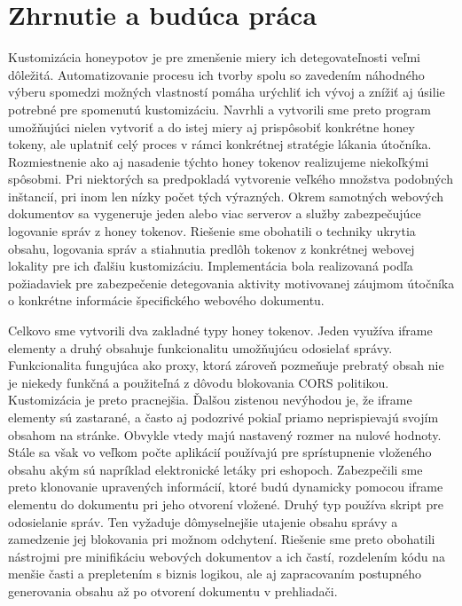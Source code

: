 \documentclass[conference, 11pt,slovak,a4paper,twoside]{IEEEtran}
\begin{document}
\section{Zhrnutie a budúca práca} \label{conclusions}

Kustomizácia honeypotov je pre zmenšenie miery ich detegovateľnosti veľmi dôležitá. Automatizovanie procesu ich tvorby spolu so zavedením náhodného výberu spomedzi možných vlastností pomáha urýchliť ich vývoj a znížiť aj úsilie potrebné pre spomenutú kustomizáciu. Navrhli a vytvorili sme preto program umožňujúci nielen vytvoriť a do istej miery aj prispôsobiť konkrétne honey tokeny, ale uplatniť celý proces v rámci konkrétnej stratégie lákania útočníka. Rozmiestnenie ako aj nasadenie týchto honey tokenov realizujeme niekoľkými spôsobmi. Pri niektorých sa predpokladá vytvorenie veľkého množstva podobných inštancií, pri inom len nízky počet tých výrazných. Okrem samotných webových dokumentov sa vygeneruje jeden alebo viac serverov a služby zabezpečujúce logovanie správ z honey tokenov. Riešenie sme obohatili o techniky ukrytia obsahu, logovania správ a stiahnutia predlôh tokenov z konkrétnej webovej lokality pre ich ďalšiu kustomizáciu. Implementácia bola realizovaná podľa požiadaviek pre zabezpečenie detegovania aktivity motivovanej záujmom útočníka o konkrétne informácie špecifického webového dokumentu.

Celkovo sme vytvorili dva zakladné typy honey tokenov. Jeden využíva iframe elementy a druhý obsahuje funkcionalitu umožňujúcu odosielať správy. Funkcionalita fungujúca ako proxy, ktorá zároveň pozmeňuje prebratý obsah nie je niekedy funkčná a použiteľná z dôvodu blokovania CORS politikou. Kustomizácia je preto pracnejšia. Ďalšou zistenou nevýhodou je, že iframe elementy sú zastarané, a často aj podozrivé pokiaľ priamo neprispievajú svojím obsahom na stránke. Obvykle vtedy majú nastavený rozmer na nulové hodnoty. Stále sa však vo veľkom počte aplikácií používajú pre sprístupnenie vloženého obsahu akým sú napríklad elektronické letáky pri eshopoch. Zabezpečili sme preto klonovanie upravených informácií, ktoré budú dynamicky pomocou iframe elementu do dokumentu pri jeho otvorení vložené. Druhý typ používa skript pre odosielanie správ. Ten vyžaduje dômyselnejšie utajenie obsahu správy a zamedzenie jej blokovania pri možnom odchytení. Riešenie sme preto obohatili nástrojmi pre minifikáciu webových dokumentov a ich častí, rozdelením kódu na menšie časti a prepletením s biznis logikou, ale aj zapracovaním postupného generovania obsahu až po otvorení dokumentu v prehliadači.
\end{document}
